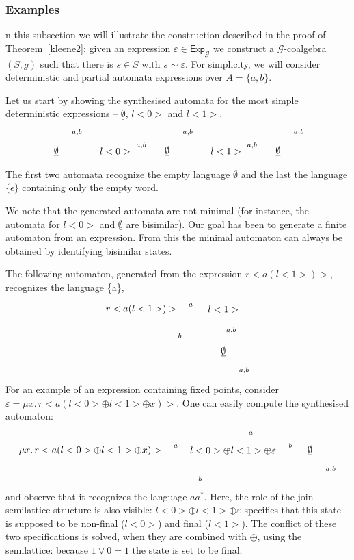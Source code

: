 \documentclass{LMCS}
\newcommand\E\varepsilon
\newcommand\Exp{\mathsf{Exp}}
\newcommand\G{\mathcal{G}}
\newcommand\emp{\underline\emptyset}
\def\hyph{-\penalty0\hskip0pt\relax}
\theoremstyle{definition}
\theoremstyle{plain}
\theoremstyle{plain}
\theoremstyle{plain}
\theoremstyle{plain}
\theoremstyle{definition}
\theoremstyle{definition}
\begin{document}
\subsubsection{Examples}\label{sec:examples_synt}
n this subsection we will illustrate the construction described in the proof of Theorem~\ref{kleene2}: given an expression $\E\in \Exp_\G$ we construct a $\G$-coalgebra $(S,g)$ such that there is $s\in S$ with $s\sim \E$. For simplicity, we will consider
deterministic and partial automata expressions over $A=\{a,b\}$.

Let us start by showing the synthesised automata for the most simple
deterministic expressions -- $\emp$, $l<0>$ and $l<1>$.
\[
\xymatrix{*++[o][F]{\emp} \ar@(r,u)[]_{a,b}} \ \ \
\xymatrix{*++[o][F]{l<0>} \ar[r]^{a,b}&  *++[o][F]{\emp } \ar@(r,u)[]_{a,b}}
\ \ \ \xymatrix{*++[o][F=] {l<1>} \ar[r]^{a,b}&  *++[o][F]{\emp}
\ar@(r,u)[]_{a,b}}
\]
The first two automata recognize the
empty language $\emptyset$ and the last the language $\{\epsilon \}$ containing only the empty
word.

We note that the 
generated automata are not minimal (for instance, the automata for  $l<0>$ and
$\emp$ are bisimilar). Our goal has been to generate a finite
automaton from an expression. From this the minimal automaton
can always be obtained by identifying bisimilar states.

The following automaton, generated from the expression
$r<a(l<1>)>$, recognizes the language \{a\},
\[
\xymatrix{ *+[F-:<3pt>]{r<a(l<1>)>} \ar[r]^-{a}\ar[dr]_{b}& *++[o][F=]{l<1>}
\ar[d]^{a,b}  \\
& *++[o][F]{\emp}  \ar@(r,d)[]^{a,b}}
\]
For an example of an expression containing fixed points, consider $\E =
\mu x.\, r<a(l<0>\oplus l<1>\oplus x)>$. One can easily compute the synthesised
automaton:
\[
\xymatrix{*+[F-:<3pt>]{\mu x.\, r<a(l<0>\oplus l<1>\oplus x)>}
\ar[r]^-{a}\ar@/{}_{2 pc}/[rr]_{b}&
*+[F=:<3pt>]{{l<0>\oplus l<1>\oplus \E}} \ar@(r,u)[]_{a}\ar[r]^-{b} &
*++[o][F]{\emp}  \ar@(r,d)[]^{a,b}}
\]
and observe that it recognizes the language $aa^*$. Here, the role of
the join\hyph semilattice structure is also visible: $l<0>\oplus l<1>\oplus
\E$ specifies that this state is supposed to be non-final ($l<0>$) and final ($l<1>$). The conflict of these two specifications  is solved, when they are combined with $\oplus$, using the semilattice: because $1\vee 0 = 1$ the state is set to be final.
\end{document}
